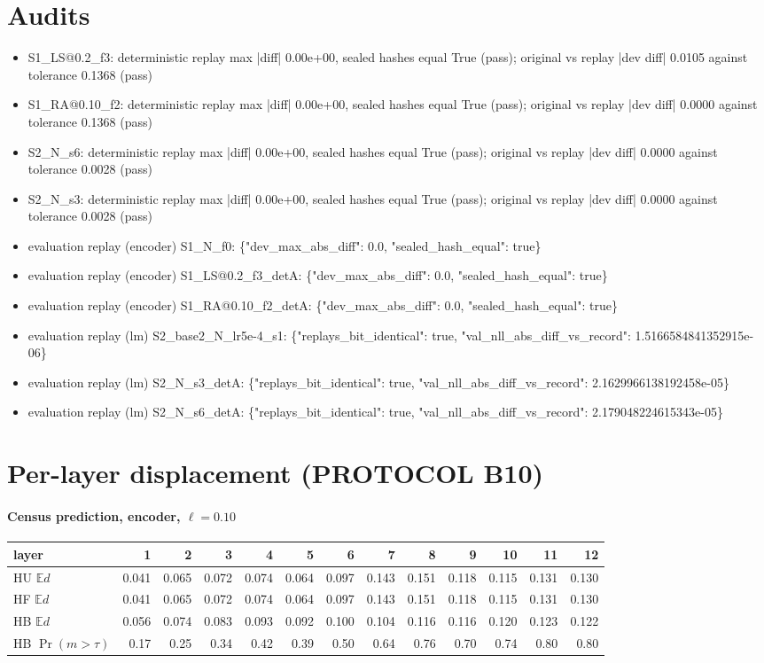 \documentclass[11pt]{article}
\begin{document}
\section{Audits}
\begin{itemize}
\item S1\_LS@0.2\_f3: deterministic replay max |diff| 0.00e+00, sealed hashes equal True (pass); original vs replay |dev diff| 0.0105 against tolerance 0.1368 (pass)
\item S1\_RA@0.10\_f2: deterministic replay max |diff| 0.00e+00, sealed hashes equal True (pass); original vs replay |dev diff| 0.0000 against tolerance 0.1368 (pass)
\item S2\_N\_s6: deterministic replay max |diff| 0.00e+00, sealed hashes equal True (pass); original vs replay |dev diff| 0.0000 against tolerance 0.0028 (pass)
\item S2\_N\_s3: deterministic replay max |diff| 0.00e+00, sealed hashes equal True (pass); original vs replay |dev diff| 0.0000 against tolerance 0.0028 (pass)
\item evaluation replay (encoder) S1\_N\_f0: \{"dev\_max\_abs\_diff": 0.0, "sealed\_hash\_equal": true\}
\item evaluation replay (encoder) S1\_LS@0.2\_f3\_detA: \{"dev\_max\_abs\_diff": 0.0, "sealed\_hash\_equal": true\}
\item evaluation replay (encoder) S1\_RA@0.10\_f2\_detA: \{"dev\_max\_abs\_diff": 0.0, "sealed\_hash\_equal": true\}
\item evaluation replay (lm) S2\_base2\_N\_lr5e-4\_s1: \{"replays\_bit\_identical": true, "val\_nll\_abs\_diff\_vs\_record": 1.5166584841352915e-06\}
\item evaluation replay (lm) S2\_N\_s3\_detA: \{"replays\_bit\_identical": true, "val\_nll\_abs\_diff\_vs\_record": 2.1629966138192458e-05\}
\item evaluation replay (lm) S2\_N\_s6\_detA: \{"replays\_bit\_identical": true, "val\_nll\_abs\_diff\_vs\_record": 2.179048224615343e-05\}
\end{itemize}
\section{Per-layer displacement (PROTOCOL B10)}
\paragraph{Census prediction, encoder, $\ell=0.10$}
\begin{tabular}{lrrrrrrrrrrrr}\toprule layer & 1 & 2 & 3 & 4 & 5 & 6 & 7 & 8 & 9 & 10 & 11 & 12\\\midrule
HU $\mathbb{E}d$ & 0.041 & 0.065 & 0.072 & 0.074 & 0.064 & 0.097 & 0.143 & 0.151 & 0.118 & 0.115 & 0.131 & 0.130\\
HF $\mathbb{E}d$ & 0.041 & 0.065 & 0.072 & 0.074 & 0.064 & 0.097 & 0.143 & 0.151 & 0.118 & 0.115 & 0.131 & 0.130\\
HB $\mathbb{E}d$ & 0.056 & 0.074 & 0.083 & 0.093 & 0.092 & 0.100 & 0.104 & 0.116 & 0.116 & 0.120 & 0.123 & 0.122\\
HB $\Pr(m>\tau)$ & 0.17 & 0.25 & 0.34 & 0.42 & 0.39 & 0.50 & 0.64 & 0.76 & 0.70 & 0.74 & 0.80 & 0.80\\\bottomrule\end{tabular}
\end{document}
